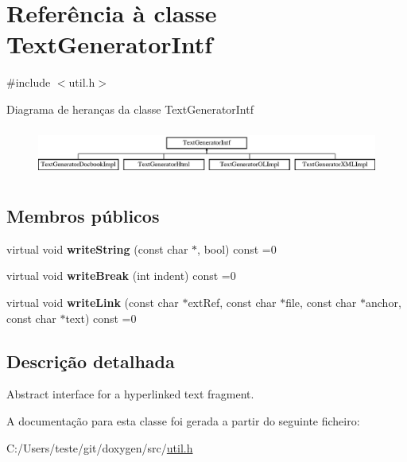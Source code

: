 \hypertarget{class_text_generator_intf}{\section{Referência à classe Text\-Generator\-Intf}
\label{class_text_generator_intf}
}


{\ttfamily \#include $<$util.\-h$>$}

Diagrama de heranças da classe Text\-Generator\-Intf\begin{figure}[H]
\begin{center}
\leavevmode
\includegraphics[height=1.627907cm]{class_text_generator_intf}
\end{center}
\end{figure}
\subsection*{Membros públicos}
\begin{DoxyCompactItemize}
\item 
\hypertarget{class_text_generator_intf_a9eb5a1eef76c84809316a10131ee1cc2}{virtual void {\bfseries write\-String} (const char $\ast$, bool) const =0}\label{class_text_generator_intf_a9eb5a1eef76c84809316a10131ee1cc2}

\item 
\hypertarget{class_text_generator_intf_a8d9c15d87de26863c75d2a2bd4ad9367}{virtual void {\bfseries write\-Break} (int indent) const =0}\label{class_text_generator_intf_a8d9c15d87de26863c75d2a2bd4ad9367}

\item 
\hypertarget{class_text_generator_intf_af310f857f964f7cdb158c1b7f7280241}{virtual void {\bfseries write\-Link} (const char $\ast$ext\-Ref, const char $\ast$file, const char $\ast$anchor, const char $\ast$text) const =0}\label{class_text_generator_intf_af310f857f964f7cdb158c1b7f7280241}

\end{DoxyCompactItemize}


\subsection{Descrição detalhada}
Abstract interface for a hyperlinked text fragment. 

A documentação para esta classe foi gerada a partir do seguinte ficheiro\-:\begin{DoxyCompactItemize}
\item 
C\-:/\-Users/teste/git/doxygen/src/\hyperlink{util_8h}{util.\-h}\end{DoxyCompactItemize}
